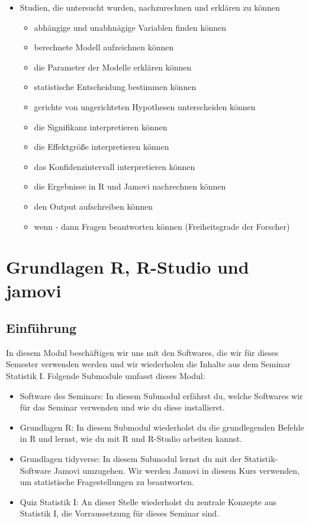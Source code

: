 \documentclass[
]{book}
\providecommand{\tightlist}{%
  \setlength{\itemsep}{0pt}\setlength{\parskip}{0pt}}
\begin{document}
\begin{itemize}
\tightlist
\item
  Studien, die untersucht wurden, nachzurechnen und erklären zu können

  \begin{itemize}
  \tightlist
  \item
    abhängige und unabhnägige Variablen finden können
  \item
    berechnete Modell aufzeichnen können
  \item
    die Parameter der Modelle erklären können
  \item
    statistische Entscheidung bestimmen können
  \item
    gerichte von ungerichteten Hypothesen unterscheiden können
  \item
    die Signifikanz interpretieren können
  \item
    die Effektgröße interpretieren können
  \item
    das Konfidenzintervall interpretieren können
  \item
    die Ergebnisse in R und Jamovi nachrechnen können
  \item
    den Output aufschreiben können
  \item
    wenn - dann Fragen beantworten können (Freiheitsgrade der Forscher)
  \end{itemize}
\end{itemize}

\hypertarget{grundlagen-r-r-studio-und-jamovi}{%
\chapter{Grundlagen R, R-Studio und jamovi}\label{grundlagen-r-r-studio-und-jamovi}}

\hypertarget{einfuxfchrung-1}{%
\section{Einführung}\label{einfuxfchrung-1}}

In diesem Modul beschäftigen wir uns mit den Softwares, die wir für dieses Semester verwenden werden und wir wiederholen die Inhalte aus dem Seminar Statistik I. Folgende Submodule umfasst dieses Modul:

\begin{itemize}
\tightlist
\item
  Software des Seminars: In diesem Submodul erfährst du, welche Softwares wir für das Seminar verwenden und wie du diese installierst.
\item
  Grundlagen R: In diesem Submodul wiederholst du die grundlegenden Befehle in R und lernst, wie du mit R und R-Studio arbeiten kannst.
\item
  Grundlagen tidyverse: In diesem Submodul lernst du mit der Statistik-Software Jamovi umzugehen. Wir werden Jamovi in diesem Kurs verwenden, um statistische Fragestellungen zu beantworten.
\item
  Quiz Statistik I: An dieser Stelle wiederholst du zentrale Konzepte aus Statistik I, die Vorraussetzung für dieses Seminar sind.
\end{itemize}
\end{document}
